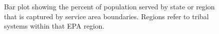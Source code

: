 \documentclass[12pt]{article}
\begin{document}
\begin{figure}


\caption{\label{fig-statePopServed}Bar plot showing the percent of
population served by state or region that is captured by service area
boundaries. Regions refer to tribal systems within that EPA region.}

\end{figure}%
\end{document}
